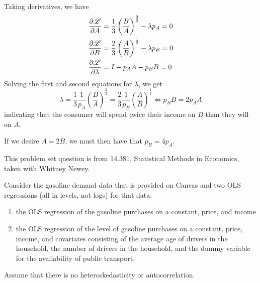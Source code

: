 \documentclass[answers, reflections, 11pt]{padajar-pset}
\begin{document}
\begin{questions}
\begin{parts}
\begin{subparts}
\begin{solution}
				Taking derivatives, we have
				\begin{align*}
					\pdv{\mathscr{L}}{A} & = \frac13 \left(\frac{B}{A}\right)^{\frac23} - \lambda p_A =0 \\
					\pdv{\mathscr{L}}{B} & = \frac23 \left(\frac{A}{B}\right)^{\frac13} - \lambda p_B =0 \\
					\pdv{\mathscr{L}}{\lambda} & = I - p_A A - p_BB = 0
				\end{align*}
				Solving the first and second equations for $\lambda$, we get
				\[
				\lambda = \frac13 \frac{1}{p_A}\left(\frac{B}{A}\right)^{\frac23} = \frac23 \frac{1}{p_B} \left(\frac{A}{B}\right)^{\frac13} \iff p_B B = 2p_A A
				\]
				indicating that the consumer will spend twice their income on $B$ than they will on $A$.

				If we desire $A = 2B$, we must then have that $p_B = 4 p_A$.
			\end{solution}
			\begin{reflection}
				\lipsum[4]
			\end{reflection}
		\end{subparts}
	\end{parts}


	This problem set question is from 14.381, Statistical Methods in Economics, taken with Whitney Newey.

	Consider the gasoline demand data that is provided on Canvas and two OLS regressions (all in levels, not logs) for that data:
	\begin{enumerate}[label=\roman*)]
		\item the OLS regression of the gasoline purchases on a constant, price, and income
		\item the OLS regression of the level of gasoline purchases on a constant, price, income, and covariates consisting of the average age of drivers in the household, the number of drivers in the household, and the dummy variable for the availability of public transport.
	\end{enumerate}
	Assume that there is no heteroskedasticity or autocorrelation.

\end{questions}
\end{document}
